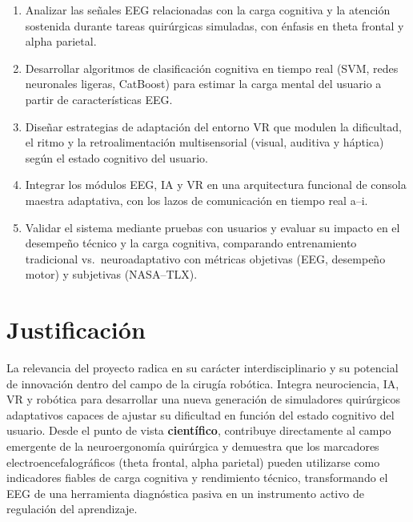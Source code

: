 \documentclass[12pt]{article}
\begin{document}
\begin{enumerate}
    \item Analizar las señales EEG relacionadas con la carga
    cognitiva y la atención sostenida durante tareas quirúrgicas
    simuladas, con énfasis en theta frontal y alpha parietal.
    \item Desarrollar algoritmos de clasificación cognitiva en
    tiempo real (SVM, redes neuronales ligeras, CatBoost) para
    estimar la carga mental del usuario a partir de
    características EEG.
    \item Diseñar estrategias de adaptación del entorno VR que
    modulen la dificultad, el ritmo y la retroalimentación
    multisensorial (visual, auditiva y háptica) según el estado
    cognitivo del usuario.
    \item Integrar los módulos EEG, IA y VR en una arquitectura
    funcional de consola maestra adaptativa, con los lazos de
    comunicación en tiempo real a--i.
    \item Validar el sistema mediante pruebas con usuarios y
    evaluar su impacto en el desempeño técnico y la carga
    cognitiva, comparando entrenamiento tradicional vs.\
    neuroadaptativo con métricas objetivas (EEG, desempeño motor)
    y subjetivas (NASA--TLX).
\end{enumerate}


\section{Justificación}

La relevancia del proyecto radica en su carácter
interdisciplinario y su potencial de innovación dentro del campo
de la cirugía robótica. Integra neurociencia, IA, VR y robótica
para desarrollar una nueva generación de simuladores quirúrgicos
adaptativos capaces de ajustar su dificultad en función del
estado cognitivo del usuario. Desde el punto de vista
\textbf{científico}, contribuye directamente al campo emergente
de la neuroergonomía quirúrgica y demuestra que los marcadores
electroencefalográficos (theta frontal, alpha parietal) pueden
utilizarse como indicadores fiables de carga cognitiva y
rendimiento técnico, transformando el EEG de una herramienta
diagnóstica pasiva en un instrumento activo de regulación del
aprendizaje.
\end{document}
